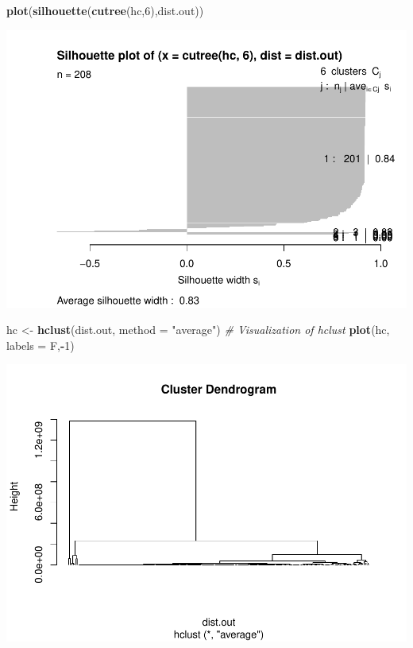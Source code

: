\documentclass[
]{article}
\newenvironment{Shaded}{\begin{snugshade}}{\end{snugshade}}
\newcommand{\CommentTok}[1]{\textcolor[rgb]{0.56,0.35,0.01}{\textit{#1}}}
\newcommand{\DataTypeTok}[1]{\textcolor[rgb]{0.13,0.29,0.53}{#1}}
\newcommand{\DecValTok}[1]{\textcolor[rgb]{0.00,0.00,0.81}{#1}}
\newcommand{\KeywordTok}[1]{\textcolor[rgb]{0.13,0.29,0.53}{\textbf{#1}}}
\newcommand{\NormalTok}[1]{#1}
\newcommand{\OperatorTok}[1]{\textcolor[rgb]{0.81,0.36,0.00}{\textbf{#1}}}
\newcommand{\StringTok}[1]{\textcolor[rgb]{0.31,0.60,0.02}{#1}}
\begin{document}
\begin{Shaded}
\begin{Highlighting}[]
\KeywordTok{plot}\NormalTok{(}\KeywordTok{silhouette}\NormalTok{(}\KeywordTok{cutree}\NormalTok{(hc,}\DecValTok{6}\NormalTok{),dist.out))}
\end{Highlighting}
\end{Shaded}

\includegraphics{Assignment1_files/figure-latex/unnamed-chunk-26-6.pdf}

\begin{Shaded}
\begin{Highlighting}[]
\NormalTok{hc <-}\StringTok{ }\KeywordTok{hclust}\NormalTok{(dist.out,}
             \DataTypeTok{method =} \StringTok{"average"}\NormalTok{)}
\CommentTok{# Visualization of hclust}
\KeywordTok{plot}\NormalTok{(hc, }\DataTypeTok{labels =}\NormalTok{ F,}\OperatorTok{-}\DecValTok{1}\NormalTok{)}
\end{Highlighting}
\end{Shaded}

\includegraphics{Assignment1_files/figure-latex/unnamed-chunk-26-7.pdf}
\end{document}
